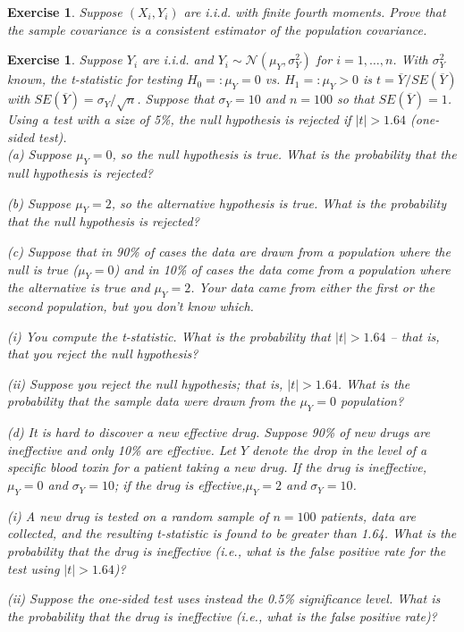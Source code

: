 \documentclass{article}
\newtheorem{exercise}[theorem]{Exercise}
\begin{document}
\begin{exercise}%
Suppose $(X_i, Y_i)$ are i.i.d. with finite fourth moments. Prove that the sample covariance is a consistent estimator of the population covariance.
\end{exercise}

\begin{exercise}%
Suppose $Y_i$ are i.i.d. and $Y_i\sim\mathcal{N}(\mu_Y, \sigma_Y^2)$ for $i=1, \dots, n$. With $\sigma_Y^2$ known, the t-statistic for testing $H_0=:\mu_Y=0$ vs. $H_1=:\mu_Y>0$ is $t=\overline{Y}/SE(\overline{Y})$ with $SE(\overline{Y})=\sigma_Y/\sqrt{n}$. Suppose that $\sigma_Y=10$ and $n=100$ so that $SE(\overline{Y})=1$. Using a test with a size of 5\%, the null hypothesis is rejected if $\mid t \mid > 1.64$ (one-sided test).\\

(a) Suppose $\mu_Y = 0$, so the null hypothesis is true. What is the probability that the null hypothesis is rejected?

(b) Suppose $\mu_Y = 2$, so the alternative hypothesis is true. What is the probability that the null hypothesis is rejected?

(c) Suppose that in 90\% of cases the data are drawn from a population where the null is true ($\mu_Y = 0$) and in 10\% of cases the data come from a population where the alternative is true and $\mu_Y = 2$. Your data came from either the first or the second population, but you don’t know which.

\hspace{.5cm} (i) You compute the t-statistic. What is the probability that $\mid t \mid > 1.64$ -- that is, that you reject the null hypothesis?

\hspace{.5cm} (ii) Suppose you reject the null hypothesis; that is, $\mid t \mid > 1.64$. What is the probability that the sample data were drawn from the $\mu_Y = 0$ population?

(d) It is hard to discover a new effective drug. Suppose 90\% of new drugs are ineffective and only 10\% are effective. Let $Y$ denote the drop in the level of a specific blood toxin for a patient taking a new drug. If the drug is ineffective, $\mu_Y = 0$ and $\sigma_Y=10$; if the drug is effective,$\mu_Y = 2$ and $\sigma_Y=10$.

\hspace{.5cm} (i) A new drug is tested on a random sample of $n = 100$ patients, data are collected, and the resulting t-statistic is found to be greater than 1.64. What is the probability that the drug is ineffective (i.e., what is the false positive rate for the test using $\mid t \mid > 1.64$)?

\hspace{.5cm} (ii) Suppose the one-sided test uses instead the 0.5\% significance level. What is the probability that the drug is ineffective (i.e., what is the false positive rate)?

\end{exercise}
\end{document}
